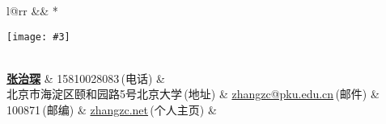 \newcommand{\paint}[3]{
    \begin{minipage}{#1}
        \texttt{[image: \#3]}
    \end{minipage} 
}
\newcommand{\myheader}{
\begin{tabular*}{\textwidth}{l@{\extracolsep{\fill}}rr}
  && \multirow{4}*{\paint{2.6cm}{3.2cm}{./image.jpg}}\\
  \specialrule{0em}{4pt}{4pt}
  \textbf{\href{http://herechen.github.io}{\LARGE 张治琛}} & 15810028083$\,${\color{labelgrey}(电话)} &\\
  北京市海淀区颐和园路5号北京大学$\,${\color{labelgrey}(地址)} & \href{mailto:zhangzc@pku.edu.cn}{zhangzc@pku.edu.cn}$\,${\color{labelgrey}(邮件)} & \\
  100871$\,${\color{labelgrey}(邮编)} & \href{http://www.zhangzc.net}{zhangzc.net}$\,${\color{labelgrey}(个人主页)} & \\
  \end{tabular*}\\\vspace{0.1in}
}

\myheader

